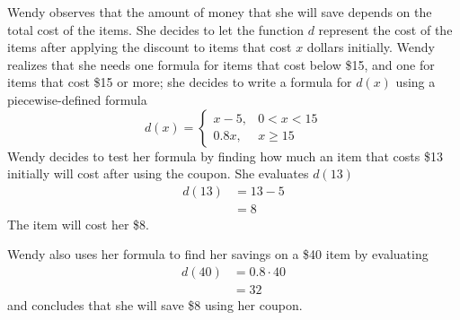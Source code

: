 \begin{pccexample}[Coupons]
  Wendy observes that the amount of money that she will save depends 
  on the total cost of the items. She decides to let the function $d$ 
  represent the cost of the items after applying the discount to 
  items that cost $x$ dollars initially. Wendy realizes that she needs one
   formula for items that cost below \$15, and one for items 
   that cost \$15 or more; she decides to write a formula for $d(x)$ 
   using a piecewise-defined formula 
\[
    d(x)=
    \begin{cases}
      x-5, & 0<x<15\\
      0.8x, & x\geq 15
    \end{cases}
\]
Wendy decides to test her formula by finding how much an item that 
costs \$13 initially will cost after using the coupon. She evaluates $d(13)$
\begin{align*}
  d(13)&=13-5\\
  &=8
\end{align*}
The item will cost her \$8.

Wendy also uses her formula to find her savings on a \$40 item by 
evaluating
\begin{align*}
  d(40)&=0.8\cdot 40\\
  &=32
\end{align*}
and concludes that she will save \$8 using her coupon.
\end{pccexample}


